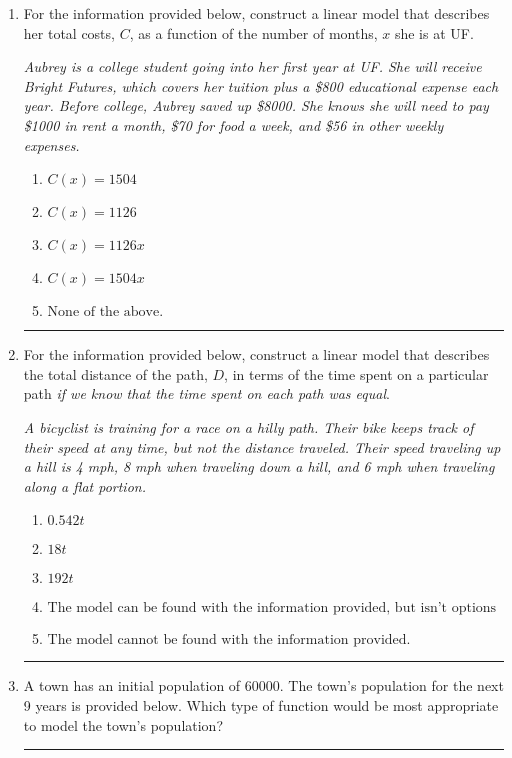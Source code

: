 \documentclass[14pt]{extbook}
\newcommand{\litem}[1]{\item#1\hspace*{-1cm}\rule{\textwidth}{0.4pt}}
\begin{document}
\begin{enumerate}
{\begin{enumerate}[label=\Alph*.]
\end{enumerate} }
\litem{
For the information provided below, construct a linear model that describes her total costs, $C$, as a function of the number of months, $x$ she is at UF. 
\begin{center}
    \textit{ Aubrey is a college student going into her first year at UF. She will receive Bright Futures, which covers her tuition plus a \$800 educational expense each year. Before college, Aubrey saved up \$8000. She knows she will need to pay \$1000 in rent a month, \$70 for food a week, and \$56 in other weekly expenses. }
\end{center}
\begin{enumerate}[label=\Alph*.]
\item \( C(x) = 1504 \)
\item \( C(x) = 1126 \)
\item \( C(x) = 1126 x \)
\item \( C(x) = 1504 x \)
\item \( \text{None of the above.} \)

\end{enumerate} }
\litem{
For the information provided below, construct a linear model that describes the total distance of the path, $D$, in terms of the time spent on a particular path \textit{if we know that the time spent on each path was equal}.
\begin{center}
    \textit{ A bicyclist is training for a race on a hilly path. Their bike keeps track of their speed at any time, but not the distance traveled. Their speed traveling up a hill is 4 mph, 8 mph when traveling down a hill, and 6 mph when traveling along a flat portion. }
\end{center}
\begin{enumerate}[label=\Alph*.]
\item \( 0.542 t \)
\item \( 18 t \)
\item \( 192 t \)
\item \( \text{The model can be found with the information provided, but isn't options 1-3.} \)
\item \( \text{The model cannot be found with the information provided.} \)

\end{enumerate} }
\litem{
A town has an initial population of 60000. The town's population for the next 9 years is provided below. Which type of function would be most appropriate to model the town's population?

}
\end{enumerate}
\end{document}
